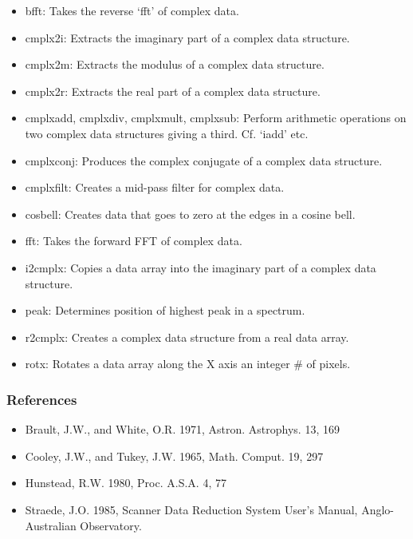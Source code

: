 \begin{itemize}
\item
   bfft: Takes the reverse `fft' of complex data.
\item
   cmplx2i: Extracts the imaginary part of a complex data structure.
\item
   cmplx2m: Extracts the modulus of a complex data structure.
\item
   cmplx2r: Extracts the real part of a complex data structure.
\item
   cmplxadd, cmplxdiv, cmplxmult, cmplxsub: Perform arithmetic operations
   on two complex data structures giving a third.  Cf. `iadd' etc.
\item
   cmplxconj: Produces the complex conjugate of a
   complex data structure.
\item
   cmplxfilt: Creates a mid-pass filter for complex data.
\item
   cosbell: Creates data that goes to zero at the edges in a
   cosine bell.
\item
   fft: Takes the forward FFT of complex data.
\item
   i2cmplx: Copies a data array into the imaginary part of a complex
   data structure.
\item
   peak: Determines position of highest peak in a spectrum.
\item
   r2cmplx: Creates a complex data structure from a real data array.
\item
   rotx: Rotates a data array along the X axis an integer \# of pixels.
\end{itemize}


\subsubsection{\label{techno6refer}References}

\begin{itemize}
\item
   Brault, J.W., and White, O.R. 1971, Astron. Astrophys. 13, 169
\item
   Cooley, J.W., and Tukey, J.W. 1965, Math. Comput. 19, 297
\item
   Hunstead, R.W. 1980, Proc. A.S.A. 4, 77
\item
   Straede, J.O. 1985, Scanner Data Reduction System User's Manual,
   Anglo-Australian Observatory.
\end{itemize}

